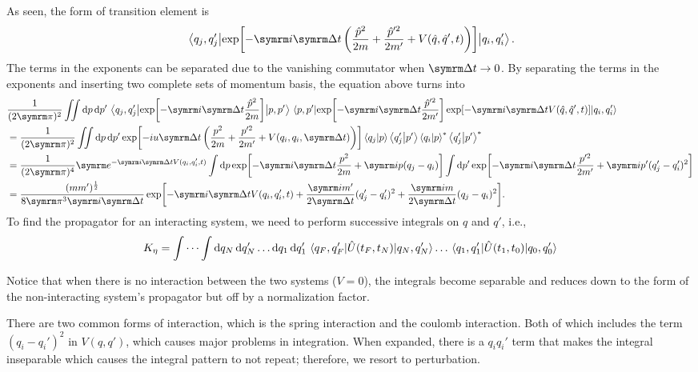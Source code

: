 As seen, the form of transition element is
\begin{equation}
    \mel{q_j, q_j'}{\exp[-\im\Dd{t}\left(\frac{\hat{p}^2}{2m} + \frac{\hat{p}'^2}{2m'} + V(\hat{q}, \hat{q}', t)\right)]}{q_i, q_i'}.
\end{equation}
The terms in the exponents can be separated due to the vanishing commutator when $\Dd{t} \appr 0$. By separating the terms in the exponents and inserting two complete sets of momentum basis, the equation above turns into
\begin{align}
    & \frac{1}{(2\cpi)^2} \iint\dd{p}\dd{p'} \mel{q_j, q_j'}{\exp[-\im\Dd{t}\frac{\hat{p}^2}{2m}]}{p, p'}\mel{p, p'}{\exp[-\im\Dd{t}\frac{\hat{p}'^2}{2m'}]\exp[-\im\Dd{t}V(\hat{q}, \hat{q}', t)]}{q_i, q_i'} \nonumber\\
    &= \frac{1}{(2\cpi)^2} \iint\dd{p}\dd{p'} \exp[-iu\Dd{t}\left(\frac{p^2}{2m} + \frac{p'^2}{2m'} + V(q_i, q_i, \Dd{t})\right)]\braket{q_j}{p}\braket{q_j'}{p'}\braket{q_i}{p}\conj\braket{q_j'}{p'}\conj \nonumber\\
    &= \frac{1}{(2\cpi)^4} \e^{-\im\Dd{t}V(q_i, q_i', t)} \int\dd{p}\exp[-\im\Dd{t}\frac{p^2}{2m} + \im p(q_j - q_i)]\int\dd{p'}\exp[-\im\Dd{t}\frac{p'^2}{2m'} + \im p'(q_j' - q_i')^2] \nonumber\\
    &= \frac{(mm')^{\frac{1}{2}}}{8\cpi^3\im\Dd{t}}\exp[-\im\Dd{t}V(q_i, q_i', t) + \frac{\im m'}{2\Dd{t}}(q_j' - q_i')^2 + \frac{\im m}{2\Dd{t}}(q_j - q_i)^2].
\end{align}
To find the propagator for an interacting system, we need to perform successive integrals on $q$ and $q'$, i.e.,
\begin{equation}
    K_{\eta} = \idotsint \dd{q_N}\dd{q_N'}\dots\dd{q_1}\dd{q_1'}\mel{q_F, q_F'}{\hat{U}(t_F, t_N)}{q_N, q_N'}\dots\mel{q_1, q_1'}{\hat{U}(t_1, t_0)}{q_0, q_0'}
\end{equation}

Notice that when there is no interaction between the two systems ($V = 0$), the integrals become separable and reduces down to the form of the non-interacting system's propagator but off by a normalization factor.

There are two common forms of interaction, which is the spring interaction and the coulomb interaction. Both of which includes the term $(q_i - q_i')^2$ in $V(q, q')$, which causes major problems in integration. When expanded, there is a $q_iq_i'$ term that makes the integral inseparable which causes the integral pattern to not repeat; therefore, we resort to perturbation.

